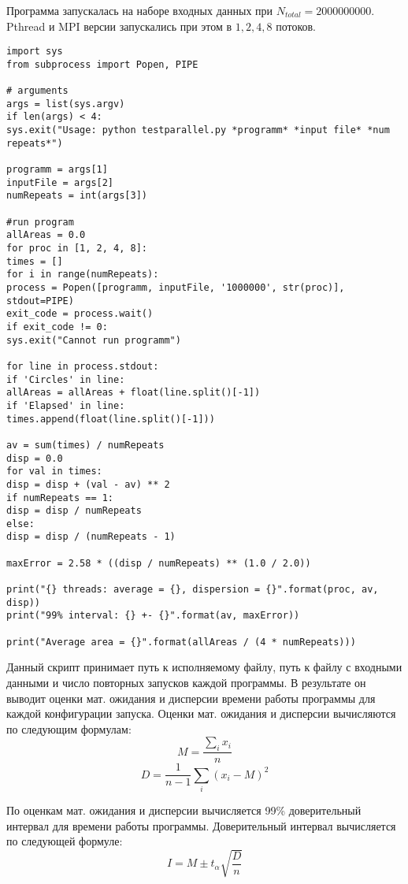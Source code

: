 Программа запускалась на наборе входных данных при $N_{total} = 2000000000$. Pthread и MPI версии запускались при этом в $1, 2, 4, 8$ потоков.
\begin{lstlisting}[caption={Скрипт запуска}, label={lst:script}]
import sys
from subprocess import Popen, PIPE

# arguments
args = list(sys.argv)
if len(args) < 4:
sys.exit("Usage: python testparallel.py *programm* *input file* *num repeats*")

programm = args[1]
inputFile = args[2]
numRepeats = int(args[3])

#run program
allAreas = 0.0
for proc in [1, 2, 4, 8]:
times = []
for i in range(numRepeats):
process = Popen([programm, inputFile, '1000000', str(proc)], stdout=PIPE)
exit_code = process.wait()
if exit_code != 0:
sys.exit("Cannot run programm")

for line in process.stdout:
if 'Circles' in line:
allAreas = allAreas + float(line.split()[-1])
if 'Elapsed' in line:
times.append(float(line.split()[-1]))

av = sum(times) / numRepeats
disp = 0.0
for val in times:
disp = disp + (val - av) ** 2
if numRepeats == 1:
disp = disp / numRepeats
else:
disp = disp / (numRepeats - 1)

maxError = 2.58 * ((disp / numRepeats) ** (1.0 / 2.0))

print("{} threads: average = {}, dispersion = {}".format(proc, av, disp))
print("99% interval: {} +- {}".format(av, maxError))

print("Average area = {}".format(allAreas / (4 * numRepeats)))
\end{lstlisting}

Данный скрипт принимает путь к исполняемому файлу, путь к файлу с входными данными и число повторных запусков каждой программы. В результате он выводит оценки мат. ожидания и дисперсии времени работы программы для каждой конфигурации запуска. Оценки мат. ожидания и дисперсии вычисляются по следующим формулам:
\begin{equation*}
	M=\frac{\sum_{i}{x_i}}{n}
\end{equation*}
\begin{equation*}
	D=\frac{1}{n - 1} {\sum_{i}{(x_i - M)^2}}
\end{equation*}

По оценкам мат. ожидания и дисперсии вычисляется 99\% доверительный интервал для времени работы программы. Доверительный интервал вычисляется по следующей формуле:
\begin{equation*}
	I = M \pm t_{\alpha} \sqrt{\frac{D}{n}}
\end{equation*}

